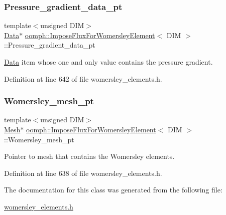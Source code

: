 \subsubsection{\texorpdfstring{Pressure\+\_\+gradient\+\_\+data\+\_\+pt}{Pressure\_gradient\_data\_pt}}
{\footnotesize\ttfamily template$<$unsigned D\+IM$>$ \\
\hyperlink{classoomph_1_1Data}{Data}$\ast$ \hyperlink{classoomph_1_1ImposeFluxForWomersleyElement}{oomph\+::\+Impose\+Flux\+For\+Womersley\+Element}$<$ D\+IM $>$\+::Pressure\+\_\+gradient\+\_\+data\+\_\+pt\hspace{0.3cm}{\ttfamily [private]}}



\hyperlink{classoomph_1_1Data}{Data} item whose one and only value contains the pressure gradient. 



Definition at line 642 of file womersley\+\_\+elements.\+h.

\mbox{\label{classoomph_1_1ImposeFluxForWomersleyElement_aa6b7bb4b9d527576ca8ee16918d0cbb4}} 
\subsubsection{\texorpdfstring{Womersley\+\_\+mesh\+\_\+pt}{Womersley\_mesh\_pt}}
{\footnotesize\ttfamily template$<$unsigned D\+IM$>$ \\
\hyperlink{classoomph_1_1Mesh}{Mesh}$\ast$ \hyperlink{classoomph_1_1ImposeFluxForWomersleyElement}{oomph\+::\+Impose\+Flux\+For\+Womersley\+Element}$<$ D\+IM $>$\+::Womersley\+\_\+mesh\+\_\+pt\hspace{0.3cm}{\ttfamily [private]}}



Pointer to mesh that contains the Womersley elements. 



Definition at line 638 of file womersley\+\_\+elements.\+h.



The documentation for this class was generated from the following file\+:\begin{DoxyCompactItemize}
\item 
\hyperlink{womersley__elements_8h}{womersley\+\_\+elements.\+h}\end{DoxyCompactItemize}
